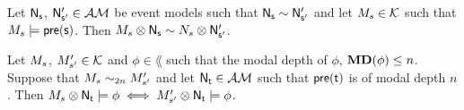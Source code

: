 \begin{lemma} \label{eventModelEquivalent}
Let $\mathrm{\mathsf{\mathrm{\mathsf{N}}_s}}$, $\mathrm{\mathsf{\mathrm{\mathsf{N}}'_{s'}}} \in \mathcal{AM}$ be event models such that $\mathrm{\mathsf{\mathrm{\mathsf{N}}_s}}
\sim \mathrm{\mathsf{\mathrm{\mathsf{N}}'_{s'}}}$
and let $M_s \in \mathcal{K}$ such that $M_s \models \mathrm{\mathsf{pre(s)}}$.
Then $M_s \otimes \mathrm{\mathsf{\mathrm{\mathsf{N}}_s}} \sim N_s \otimes \mathrm{\mathsf{\mathrm{\mathsf{N}}'_{s'}}}$.
\end{lemma}

\begin{lemma} \label{nBisimilarKripkeExec}
Let $M_s$, $M'_{s'} \in \mathcal{K}$ and $\phi \in \lang$ such that the modal depth of $\phi$,
${\bf MD}(\phi) \leq n$.
Suppose that $M_s \sim_{2n} M'_{s'}$ and let $\mathrm{\mathsf{\mathrm{\mathsf{N}}_t}} \in
\mathcal{AM}$ such that $\mathrm{\mathsf{pre(t)}}$ is of modal depth $n$.
Then $M_s \otimes \mathrm{\mathsf{\mathrm{\mathsf{N}}_t}} \models \phi \iff M'_{s'} \otimes \mathrm{\mathsf{\mathrm{\mathsf{N}}_t}} \models \phi$.
\end{lemma}

